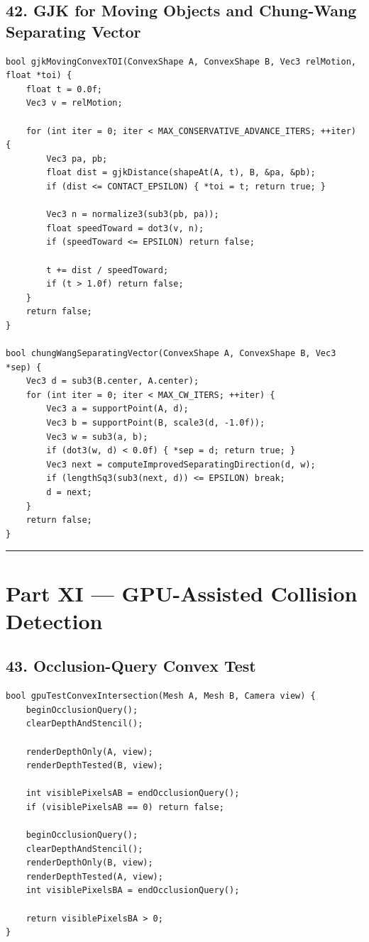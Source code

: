 \documentclass[10pt,letterpaper]{article}
\begin{document}
\subsection*{42. GJK for Moving Objects and Chung-Wang Separating Vector}

\begin{verbatim}
bool gjkMovingConvexTOI(ConvexShape A, ConvexShape B, Vec3 relMotion, float *toi) {
    float t = 0.0f;
    Vec3 v = relMotion;

    for (int iter = 0; iter < MAX_CONSERVATIVE_ADVANCE_ITERS; ++iter) {
        Vec3 pa, pb;
        float dist = gjkDistance(shapeAt(A, t), B, &pa, &pb);
        if (dist <= CONTACT_EPSILON) { *toi = t; return true; }

        Vec3 n = normalize3(sub3(pb, pa));
        float speedToward = dot3(v, n);
        if (speedToward <= EPSILON) return false;

        t += dist / speedToward;
        if (t > 1.0f) return false;
    }
    return false;
}

bool chungWangSeparatingVector(ConvexShape A, ConvexShape B, Vec3 *sep) {
    Vec3 d = sub3(B.center, A.center);
    for (int iter = 0; iter < MAX_CW_ITERS; ++iter) {
        Vec3 a = supportPoint(A, d);
        Vec3 b = supportPoint(B, scale3(d, -1.0f));
        Vec3 w = sub3(a, b);
        if (dot3(w, d) < 0.0f) { *sep = d; return true; }
        Vec3 next = computeImprovedSeparatingDirection(d, w);
        if (lengthSq3(sub3(next, d)) <= EPSILON) break;
        d = next;
    }
    return false;
}
\end{verbatim}

\medskip\hrule\medskip


\clearpage
{}
\section*{Part XI --- GPU-Assisted Collision Detection}


\subsection*{43. Occlusion-Query Convex Test}

\begin{verbatim}
bool gpuTestConvexIntersection(Mesh A, Mesh B, Camera view) {
    beginOcclusionQuery();
    clearDepthAndStencil();

    renderDepthOnly(A, view);
    renderDepthTested(B, view);

    int visiblePixelsAB = endOcclusionQuery();
    if (visiblePixelsAB == 0) return false;

    beginOcclusionQuery();
    clearDepthAndStencil();
    renderDepthOnly(B, view);
    renderDepthTested(A, view);
    int visiblePixelsBA = endOcclusionQuery();

    return visiblePixelsBA > 0;
}
\end{verbatim}
\end{document}
